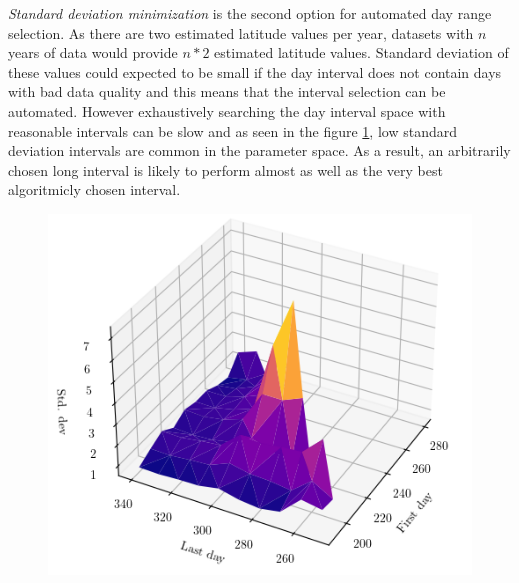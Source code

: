 \textit{Standard deviation minimization} is the second option for automated day range selection. As there are two estimated latitude values per year, datasets with $n$ years of data would provide $n*2$ estimated latitude values. Standard deviation of these values could expected to be small if the day interval does not contain days with bad data quality and this means that the interval selection can be automated. However exhaustively searching the day interval space with reasonable intervals can be slow and as seen in the figure \ref{fig_heatmap3d2}, low standard deviation intervals are common in the parameter space. As a result, an arbitrarily chosen long interval is likely to perform almost as well as the very best algoritmicly chosen interval.




\begin{figure}[]
\centering
\includegraphics[width=0.5\linewidth]{pics/heatmap3d2}
\label{fig_heatmap3d2}
\end{figure}

\newpage

